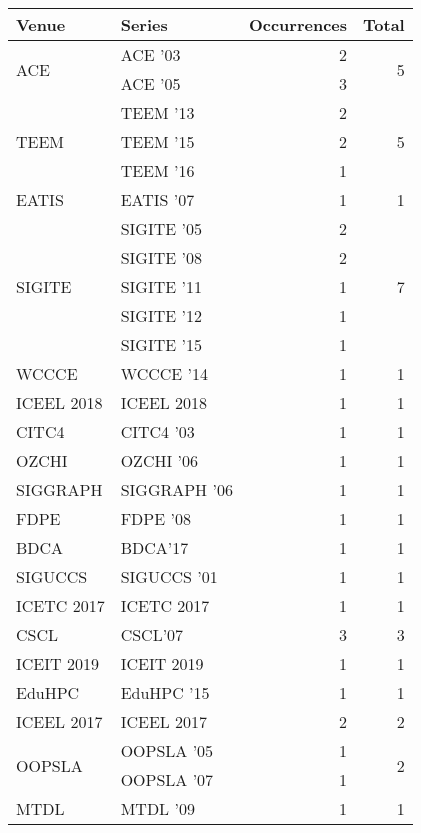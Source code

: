 \begin{table*}[t]
\begin{tabular}{llrr}
Venue & Series & Occurrences & Total\\\hline
\multirow{2}{*}{ACE } & ACE '03 & 2 & \multirow{2}{*}{5}\\
& ACE '05 & 3 &\\
\multirow{3}{*}{TEEM } & TEEM '13 & 2 & \multirow{3}{*}{5}\\
& TEEM '15 & 2 &\\
& TEEM '16 & 1 &\\
\multirow{1}{*}{EATIS } & EATIS '07 & 1 & \multirow{1}{*}{1}\\
\multirow{5}{*}{SIGITE } & SIGITE '05 & 2 & \multirow{5}{*}{7}\\
& SIGITE '08 & 2 &\\
& SIGITE '11 & 1 &\\
& SIGITE '12 & 1 &\\
& SIGITE '15 & 1 &\\
\multirow{1}{*}{WCCCE } & WCCCE '14 & 1 & \multirow{1}{*}{1}\\
\multirow{1}{*}{ICEEL 2018} & ICEEL 2018 & 1 & \multirow{1}{*}{1}\\
\multirow{1}{*}{CITC4 } & CITC4 '03 & 1 & \multirow{1}{*}{1}\\
\multirow{1}{*}{OZCHI } & OZCHI '06 & 1 & \multirow{1}{*}{1}\\
\multirow{1}{*}{SIGGRAPH } & SIGGRAPH '06 & 1 & \multirow{1}{*}{1}\\
\multirow{1}{*}{FDPE } & FDPE '08 & 1 & \multirow{1}{*}{1}\\
\multirow{1}{*}{BDCA} & BDCA'17 & 1 & \multirow{1}{*}{1}\\
\multirow{1}{*}{SIGUCCS } & SIGUCCS '01 & 1 & \multirow{1}{*}{1}\\
\multirow{1}{*}{ICETC 2017} & ICETC 2017 & 1 & \multirow{1}{*}{1}\\
\multirow{1}{*}{CSCL} & CSCL'07 & 3 & \multirow{1}{*}{3}\\
\multirow{1}{*}{ICEIT 2019} & ICEIT 2019 & 1 & \multirow{1}{*}{1}\\
\multirow{1}{*}{EduHPC } & EduHPC '15 & 1 & \multirow{1}{*}{1}\\
\multirow{1}{*}{ICEEL 2017} & ICEEL 2017 & 2 & \multirow{1}{*}{2}\\
\multirow{2}{*}{OOPSLA } & OOPSLA '05 & 1 & \multirow{2}{*}{2}\\
& OOPSLA '07 & 1 &\\
\multirow{1}{*}{MTDL } & MTDL '09 & 1 & \multirow{1}{*}{1}\\

\end{tabular}
\end{table*}
